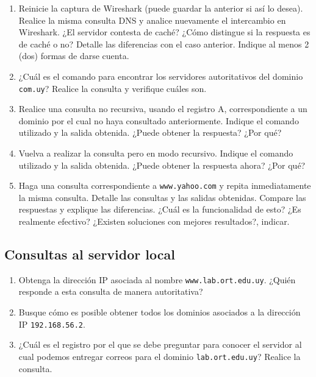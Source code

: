 \documentclass[a4paper,10pt]{article}
\begin{document}
\begin{enumerate}
    \item Reinicie la captura de Wireshark (puede guardar la anterior si así lo desea). Realice la misma consulta DNS y analice nuevamente el intercambio en Wireshark. ¿El servidor contesta de caché? ¿Cómo distingue si la respuesta es de caché o no? Detalle las diferencias con el caso anterior. Indique al menos 2 (dos) formas de darse cuenta.
    
    \item ¿Cuál es el comando para encontrar los servidores autoritativos del dominio \texttt{com.uy}? Realice la consulta y verifique cuáles son.
    
    \item Realice una consulta no recursiva, usando el registro A, correspondiente a un dominio por el cual no haya consultado anteriormente. Indique el comando utilizado y la salida obtenida. ¿Puede obtener la respuesta? ¿Por qué? 
    \item Vuelva a realizar la consulta pero en modo recursivo. Indique el comando utilizado y la salida obtenida. ¿Puede obtener la respuesta ahora? ¿Por qué? 
    \item Haga una consulta correspondiente a \texttt{www.yahoo.com} y repita inmediatamente la misma consulta. Detalle las consultas y las salidas obtenidas. Compare las respuestas y explique las diferencias. ¿Cuál es la funcionalidad de esto? ¿Es realmente efectivo? ¿Existen soluciones con mejores resultados?, indicar.
    \end{enumerate}

\subsection*{Consultas al servidor local}

    \begin{enumerate}
    \item Obtenga la dirección IP asociada al nombre \texttt{www.lab.ort.edu.uy}. ¿Quién responde a esta consulta de manera autoritativa?
    
    \item Busque cómo es posible obtener todos los dominios asociados a la dirección IP \texttt{192.168.56.2}.
    
    \item ¿Cuál es el  registro por el que se debe preguntar para conocer el servidor al cual podemos entregar correos para el dominio \texttt{lab.ort.edu.uy}? Realice la consulta.
    
\end{enumerate}
\end{document}
